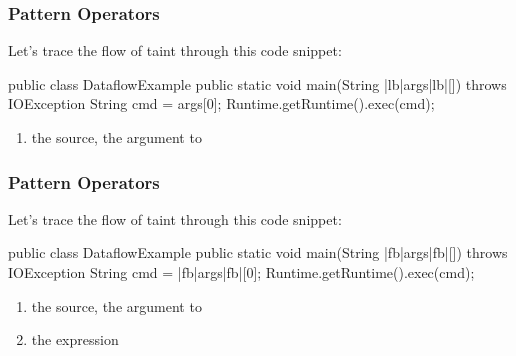 \documentclass[aspectratio=169, handout]{beamer}
\begin{document}
\begin{frame}[fragile]
  \frametitle{Pattern Operators}

  \begin{minipage}[t][1.6in][t]{\textwidth}
    Let's trace the flow of taint through this code snippet:

    \begin{pythoncodeblock}[language=java]
      public class DataflowExample {
        public static void main(String |lb|args|lb|[]) throws IOException {
          String cmd = args[0];
          Runtime.getRuntime().exec(cmd);
        }
      }
    \end{pythoncodeblock}
  \end{minipage}
  \begin{minipage}[t][1in][t]{\textwidth}
    \begin{enumerate}
      \item the source, the  argument to 
    \end{enumerate}
  \end{minipage}
\end{frame}

\begin{frame}[fragile]
  \frametitle{Pattern Operators}

  \begin{minipage}[t][1.6in][t]{\textwidth}
    Let's trace the flow of taint through this code snippet:

    \begin{pythoncodeblock}[language=java]
      public class DataflowExample {
        public static void main(String |fb|args|fb|[]) throws IOException {
          String cmd = |fb|args|fb|[0];
          Runtime.getRuntime().exec(cmd);
        }
      }
    \end{pythoncodeblock}
  \end{minipage}
  \begin{minipage}[t][1in][t]{\textwidth}
    \begin{enumerate}
      \item the source, the  argument to 
      \item the expression 
    \end{enumerate}
  \end{minipage}
\end{frame}
\end{document}
